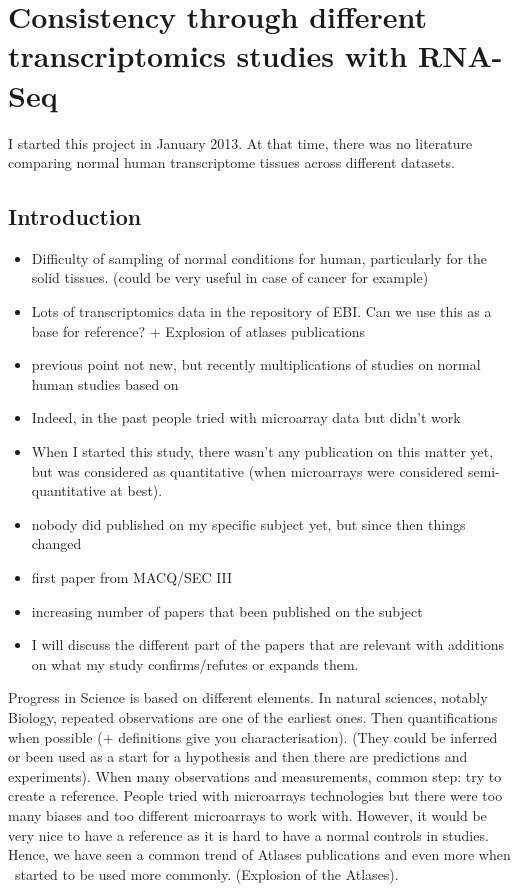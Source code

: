 \chapter{Consistency through different transcriptomics studies with RNA-Seq}
\label{ch:Transcriptomics}


I started this project in January 2013. At that time, there was no
literature comparing normal human transcriptome tissues across different datasets.

\section{Introduction}

\begin{itemize}
    \item Difficulty of sampling of normal conditions for human, particularly
        for the solid tissues. (could be very useful in case of cancer for
        example)
    \item Lots of transcriptomics data in the repository of EBI. Can we use
        this as a base for reference? + Explosion of atlases publications
    \item previous point not new, but recently multiplications of studies on
        normal human studies based on \Rnaseq
    \item Indeed, in the past people tried with microarray data but didn't work
    \item When I started this study, there wasn't any publication on this matter
        yet, but \Rnaseq was considered as quantitative (when microarrays were
        considered semi-quantitative at best).
    \item nobody did published on my specific subject yet, but since then things changed
    \item first paper from MACQ/SEC III
    \item increasing number of papers that been published on the subject
    \item I will discuss the different part of the papers that are relevant
        with additions on what my study confirms/refutes or expands them.
\end{itemize}

Progress in Science is based on different elements. In natural sciences, notably
Biology, repeated observations are one of the earliest ones. Then quantifications
when possible (+ definitions give you characterisation). (They could be inferred or
been used as a start for a hypothesis and then there are predictions and
experiments). When many observations and measurements, common step: try to create
a reference. People tried with microarrays technologies but there were too many
biases and too different microarrays to work with. However, it would be very nice
to have a reference as it is hard to have a normal controls in studies. Hence, we
have seen a common trend of Atlases publications and even more when \Rnaseq\ started
to be used more commonly. (Explosion of the Atlases).

